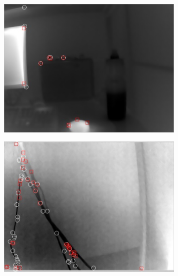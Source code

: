 \begin{figure}
\begin{subfigure}{0.49\columnwidth}
    \includegraphics[width=1.00\textwidth]{media/V_C_highsnrcornersnonlocal.jpg}
    	\caption{}
		\label{fig:imgprocessing_5}
  \end{subfigure}
	\begin{subfigure}{0.49\columnwidth}
    \centering
    \includegraphics[width=1.00\textwidth]{media/V_C_lowsnrcornersnonlocal.jpg}
		\caption{}
		\label{fig:imgprocessing_6}
  \end{subfigure} \vspace{10pt} \\ 
	\begin{subfigure}{0.49\columnwidth}
    \centering

\end{subfigure}
\end{figure}
